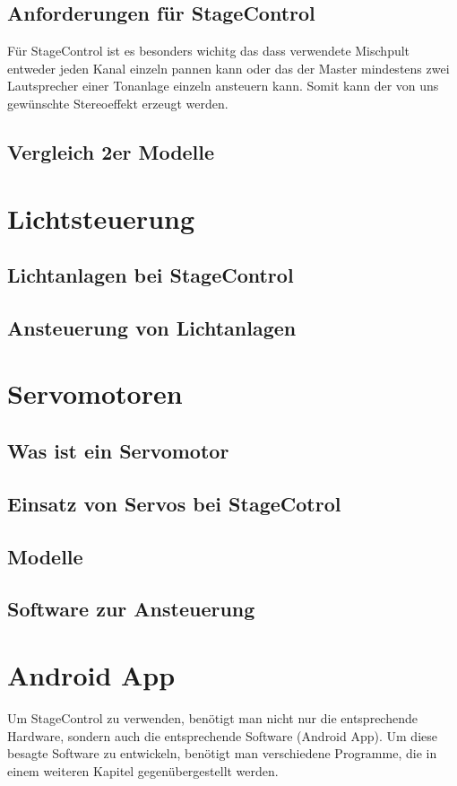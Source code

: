 \subsection{Anforderungen für StageControl}
Für StageControl ist es besonders wichitg das dass verwendete Mischpult entweder jeden Kanal einzeln pannen kann oder das der Master mindestens zwei Lautsprecher einer Tonanlage einzeln ansteuern kann. Somit kann der von uns gewünschte Stereoeffekt erzeugt werden.

\subsection{Vergleich 2er Modelle}

\section{Lichtsteuerung}
\subsection{Lichtanlagen bei StageControl}
\subsection{Ansteuerung von Lichtanlagen}

\section{Servomotoren}
\subsection{Was ist ein Servomotor}
\subsection{Einsatz von Servos bei StageCotrol}
\subsection{Modelle}
\subsection{Software zur Ansteuerung}


\section{Android App}
Um StageControl zu verwenden, benötigt man nicht nur die entsprechende Hardware, sondern auch die entsprechende Software (Android App). Um diese besagte Software zu entwickeln, benötigt man verschiedene Programme, die in einem weiteren Kapitel gegenübergestellt werden.

